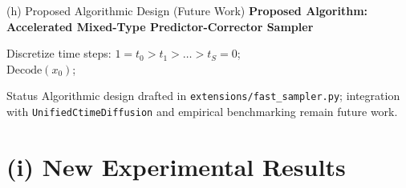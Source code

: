 \documentclass[aspectratio=169, 10pt]{beamer}
\begin{document}
\begin{frame}{(h) Proposed Algorithmic Design (Future Work)}
  \textbf{Proposed Algorithm: Accelerated Mixed-Type Predictor-Corrector Sampler}
  \begin{algorithm}[H]
    \footnotesize
    Discretize time steps: $1 = t_0 > t_1 > \dots > t_S = 0$;\\
    \Return $\text{Decode}(x_0)$;
  \end{algorithm}
  \begin{block}{Status}
    Algorithmic design drafted in \texttt{extensions/fast\_sampler.py}; integration with \texttt{UnifiedCtimeDiffusion} and empirical benchmarking remain future work.
  \end{block}
\end{frame}

\section{(i) New Experimental Results}
\end{document}
